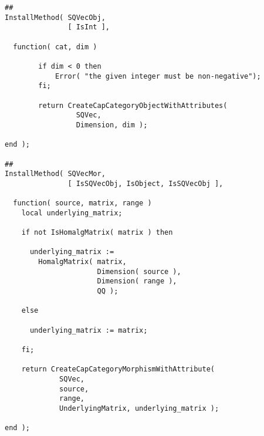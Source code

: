 \begin{small}
\begin{Verbatim}[frame=single]
##
InstallMethod( SQVecObj,
               [ IsInt ],
               
  function( cat, dim )
        
        if dim < 0 then
            Error( "the given integer must be non-negative");
        fi;
        
        return CreateCapCategoryObjectWithAttributes(
                 SQVec,
                 Dimension, dim );
         
end );

##
InstallMethod( SQVecMor,
               [ IsSQVecObj, IsObject, IsSQVecObj ],
                  
  function( source, matrix, range )
    local underlying_matrix;

    if not IsHomalgMatrix( matrix ) then
    
      underlying_matrix := 
        HomalgMatrix( matrix,
                      Dimension( source ),
                      Dimension( range ),
                      QQ );

    else

      underlying_matrix := matrix;

    fi;
    
    return CreateCapCategoryMorphismWithAttribute(
             SQVec,
             source,
             range,
             UnderlyingMatrix, underlying_matrix );
    
end );
\end{Verbatim}
\end{small}